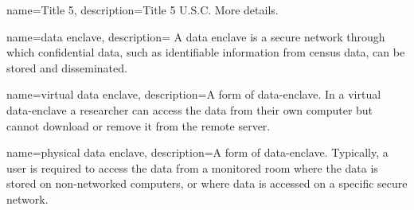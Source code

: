{
name=Title 5,
description={Title 5 U.S.C. More details.}
}

{
name=data enclave,
description={
A data enclave is a secure network through which confidential data, such as identifiable information from census data, can be stored and disseminated. }
}

{name=virtual data enclave,
description={A form of \gls{data-enclave}. In a virtual \gls{data-enclave} a researcher can access the data from their own computer but cannot download or remove it from the remote server. }
}

{name=physical data enclave,
description={A form of \gls{data-enclave}. Typically, a user is required to access the data from a monitored room where the data is stored on non-networked computers, or where data is accessed on a  specific secure network. }
}


